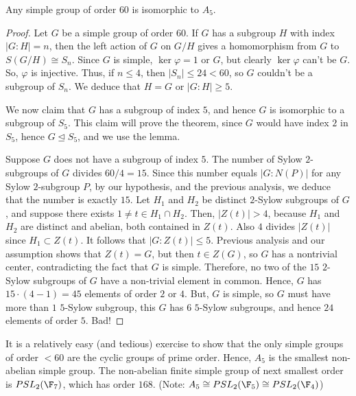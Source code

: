 \begin{thm}
    Any simple group of order $60$ is isomorphic to $A_5$.
\end{thm}

\begin{proof}
    Let $G$ be a simple group of order $60$. If $G$ has a subgroup $H$ with index $|G:H|=n$, then the left action of $G$ on $G/H$ gives a homomorphism from $G$ to $S(G/H) \cong S_n$. Since $G$ is simple, $\ker \varphi =1$ or $G$, but clearly $\ker \varphi$ can't be $G$. So, $\varphi$ is injective. Thus, if $n \leq 4$, then $|S_n| \leq 24 <60$, so $G$ couldn't be a subgroup of $S_n$. We deduce that $H=G$ or $|G:H| \geq 5$.

    We now claim that $G$ has a subgroup of index $5$, and hence $G$ is isomorphic to a subgroup of $S_5$. This claim will prove the theorem, since $G$ would have index $2$ in $S_5$, hence $G \unlhd S_5$, and we use the lemma.

    Suppose $G$ does not have a subgroup of index $5$. The number of Sylow $2$-subgroups of $G$ divides $60/4=15$. Since this number equals $|G:N(P)|$ for any Sylow $2$-subgroup $P$, by our hypothesis, and the previous analysis, we deduce that the number is exactly $15$. Let $H_1$ and $H_2$ be distinct $2$-Sylow subgroups of $G$, and suppose there exists $1 \neq t \in H_1 \cap H_2$. Then, $|Z(t)|>4$, because $H_1$ and $H_2$ are distinct and abelian, both contained in $Z(t)$. Also $4$ divides $|Z(t)|$ since $H_1 \subset Z(t)$. It follows that $|G:Z(t)| \leq 5$. Previous analysis and our assumption shows that $Z(t)=G$, but then $t \in Z(G)$, so $G$ has a nontrivial center, contradicting the fact that $G$ is simple. Therefore, no two of the $15$ $2$-Sylow subgroups of $G$ have a non-trivial element in common. Hence, $G$ has $15\cdot (4-1)=45$ elements of order $2$ or $4$. But, $G$ is simple, so $G$ must have more than $1$ $5$-Sylow subgroup, this $G$ has $6$ $5$-Sylow subgroups, and hence $24$ elements of order $5$. Bad!
\end{proof}

\begin{rmk}
    It is a relatively easy (and tedious) exercise to show that the only simple groups of order $<60$ are the cyclic groups of prime order. Hence, $A_5$ is the smallest non-abelian simple group. The non-abelian finite simple group of next smallest order is $PSL_2(\F_7)$, which has order $168$. (Note: $A_5 \cong PSL_2(\F_5)\cong PSL_2(\F_4)$)
\end{rmk}

